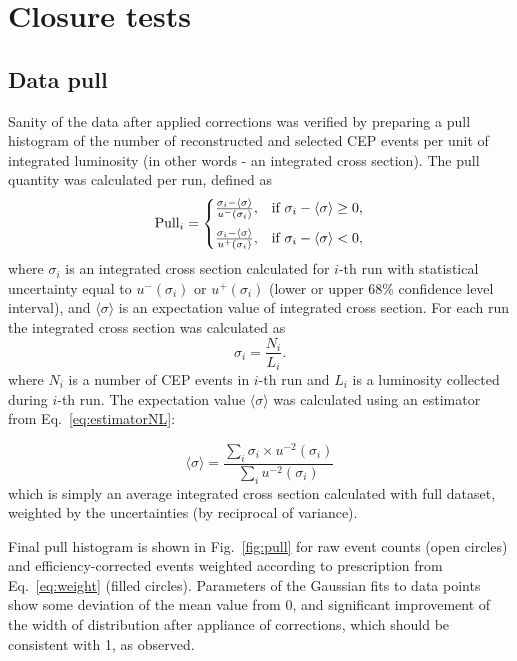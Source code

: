\section{Closure tests}\label{sec:closureTests}
\subsection{Data pull}

Sanity of the data after applied corrections was verified by preparing a pull histogram of the number of reconstructed and selected CEP events per unit of integrated luminosity (in other words - an integrated cross section). The pull quantity was calculated per run, defined as 
\begin{equation}\label{eq:pull}
  \text{Pull}_{i}=\left\{
  \begin{array}{@{}ll@{}}
    \frac{\sigma_{i}-\langle \sigma\rangle}{u^{-}(\sigma_{i})}, & \text{if}\ \sigma_{i}-\langle \sigma\rangle \geq 0, \\[8pt]
    \frac{\sigma_{i}-\langle \sigma\rangle}{u^{+}(\sigma_{i})}, & \text{if}\ \sigma_{i}-\langle \sigma\rangle < 0,
  \end{array}\right.
\end{equation}
where $\sigma_{i}$ is an integrated cross section calculated for $i$-th run with statistical uncertainty equal to $u^{-}(\sigma_{i})$ or $u^{+}(\sigma_{i})$ (lower or upper 68\% confidence level interval), and $\langle \sigma\rangle$ is an expectation value of integrated cross section. For each run the integrated cross section was calculated as
\begin{equation}\label{eq:crossSecPull}
 \sigma_{i} = \frac{N_{i}}{L_{i}}.
\end{equation}
where $N_{i}$ is a number of CEP events in $i$-th run and $L_{i}$ is a luminosity collected during $i$-th run. The expectation value $\langle \sigma\rangle$ was calculated using an estimator from Eq.~\eqref{eq:estimatorNL}:

\begin{equation}\label{eq:estimatorNL}
 \langle \sigma\rangle = \frac{\sum\limits_{i}\sigma_{i} \times u^{-2}(\sigma_{i})}{\sum\limits_{i}u^{-2}(\sigma_{i})}
\end{equation}
which is simply an average integrated cross section calculated with full dataset, weighted by the uncertainties (by reciprocal of variance).

Final pull histogram is shown in Fig.~\ref{fig:pull} for raw event counts (open circles) and efficiency-corrected events weighted according to prescription from Eq.~\eqref{eq:weight} (filled circles). Parameters of the Gaussian fits to data points show some deviation of the mean value from 0, and significant improvement of the width of distribution after appliance of corrections, which should be consistent with 1, as observed.


